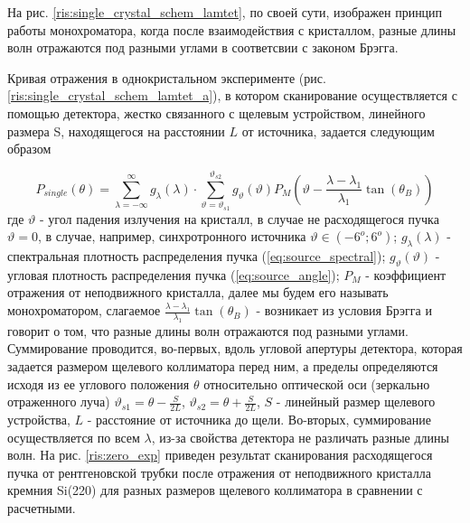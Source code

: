 На рис. \ref{ris:single_crystal_schem_lamtet}, по своей сути, изображен принцип работы монохроматора,
когда после взаимодействия с кристаллом, разные длины волн отражаются под разными углами в
соответсвии с законом Брэгга.

Кривая отражения в однокристальном эксперименте (рис. \ref{ris:single_crystal_schem_lamtet_a}), в котором сканирование осуществляется
 с помощью детектора, жестко связанного с щелевым устройством, линейного размера S, находящегося на расстоянии $L$ от источника, задается следующим образом

\begin{equation} \label{eq:p_single_crystal}
  P_{single}(\theta) = \sum_{\lambda = -\infty}^{\infty}g_{\lambda}(\lambda) \cdot \sum_{\vartheta = \vartheta_{s1}}^{\vartheta_{s2}}
  g_{\vartheta}(\vartheta) P_M(\vartheta - \frac{\lambda - \lambda_1}{\lambda_1}\tan(\theta_B))
 \end{equation}
\noindent
где $\vartheta$ - угол падения излучения на кристалл, в случае не расходящегося пучка $\vartheta = 0$, в
случае, например, синхротронного источника $\vartheta \in (-6^o; 6^o) $; $g_{\lambda}(\lambda)$
- спектральная плотность распределения пучка (\ref{eq:source_spectral}); $g_{\vartheta}(\vartheta)$ - угловая плотность
распределения пучка (\ref{eq:source_angle}); $P_M$ - коэффициент отражения от неподвижного кристалла, далее мы будем его называть монохроматором,
слагаемое $\frac{\lambda - \lambda_1}{\lambda_1}\tan(\theta_B)$ -
возникает из условия Брэгга и говорит о том, что разные длины волн отражаются под разными углами.
 Суммирование проводится, во-первых, вдоль угловой апертуры детектора, которая задается размером
 щелевого коллиматора перед ним, а пределы определяются исходя из ее углового положения $\theta$ относительно
 оптической оси (зеркально отраженного луча) $\vartheta_{s1} = \theta - \frac{S}{2L}$, $\vartheta_{s2} = \theta + \frac{S}{2L}$,
 $S $ - линейный размер щелевого устройства, $L$ - расстояние от источника до щели.
 Во-вторых, суммирование осуществляется по всем $\lambda$, из-за свойства детектора не различать разные длины волн.
На рис. \ref{ris:zero_exp} приведен результат сканирования расходящегося пучка от рентгеновской
трубки после отражения от неподвижного кристалла кремния Si(220) для разных размеров щелевого коллиматора
в сравнении с расчетными.
